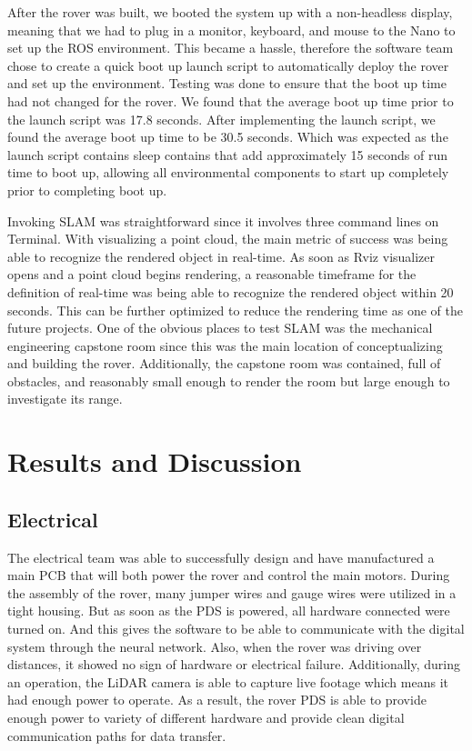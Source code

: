 \documentclass[a4paper, 10pt]{article}
\begin{document}
    After the rover was built, we booted the system up with a non-headless display, meaning that we had to plug in a monitor, keyboard, and mouse to the Nano to set up the ROS environment. This became a hassle, therefore the software team chose to create a quick boot up launch script to automatically deploy the rover and set up the environment. Testing was done to ensure that the boot up time had not changed for the rover.
    We found that the average boot up time prior to the launch script was 17.8 seconds. 
    After implementing the launch script, we found the average boot up time to be 30.5 seconds. Which was expected as the launch script contains sleep contains that add approximately 15 seconds of run time to boot up, allowing all environmental components to start up completely prior to completing boot up.
    
    Invoking SLAM was straightforward since it involves three command lines on Terminal. With visualizing a point cloud, the main metric of success was being able to recognize the rendered object in real-time. As soon as Rviz visualizer opens and a point cloud begins rendering, a reasonable timeframe for the definition of real-time was being able to recognize the rendered object within 20 seconds. This can be further optimized to reduce the rendering time as one of the future projects.
    One of the obvious places to test SLAM was the mechanical engineering capstone room since this was the main location of conceptualizing and building the rover. Additionally, the capstone room was contained, full of obstacles, and reasonably small enough to render the room but large enough to investigate its range.

\section{Results and Discussion}
	
	\subsection{Electrical}
    The electrical team was able to successfully design and have manufactured a main PCB that will both power the rover and control the main motors.
	During the assembly of the rover, many jumper wires and gauge wires were utilized in a tight housing. But as soon as the PDS is powered, all hardware connected were turned on. And this gives the software to be able to communicate with the digital system through the neural network. Also, when the rover was driving over distances, it showed no sign of hardware or electrical failure. Additionally, during an operation, the LiDAR camera is able to capture live footage which means it had enough power to operate. As a result, the rover PDS is able to provide enough power to variety of different hardware and provide clean digital communication paths for data transfer.
\end{document}
